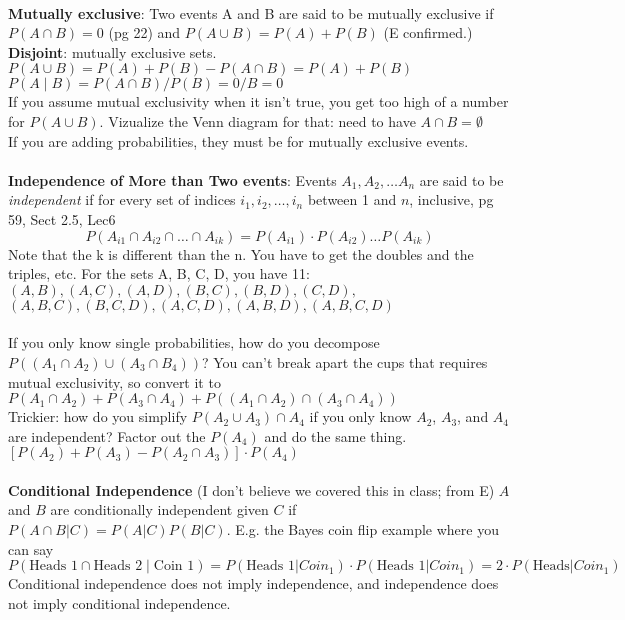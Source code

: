 \hfill \\
\textbf{Mutually exclusive}: Two events A and B are said to be mutually exclusive if $P(A \cap B) = 0$ {\tiny (pg 22)} and $P(A \cup B) = P(A) + P(B)$  {\tiny (E confirmed.)}
\textbf{Disjoint}: mutually exclusive sets. \hfill \\
$P(A \cup B) = P(A) + P(B) - P(A \cap B) = P(A) + P(B) $ \hfill \\
$P(A \mid B) = P(A \cap B)/P(B) = 0/B = 0 $ \hfill \\
If you assume mutual exclusivity when it isn't true, you get too high of a number for $P(A \cup B)$.  Vizualize the Venn diagram for that: need to have $A \cap B = \emptyset$ \hfill \\
If you are adding probabilities, they must be for mutually exclusive events. \hfill \\

\hfill \\
\textbf{Independence of More than Two events}:
Events $A_1, A_2, \dots  A_n$ are said to be \textit{independent} if for every set of indices $i_1, i_2, \dots, i_n$ between 1 and $n$, inclusive,  {\tiny pg 59, Sect 2.5, Lec6}
	\[ P(A_{i1} \cap A_{i2} \cap \dots \cap A_{ik}) = P(A_{i1}) \cdot P(A_{i2}) \dots P(A_{ik}) \]
Note that the k is different than the n.  You have to get the doubles and the triples, etc. 
For the sets A, B, C, D, you have 11: $(A, B), (A, C), (A, D), (B, C), (B, D), (C, D),$ \\
$(A, B, C), (B, C, D), (A, C, D), (A, B, D), (A, B, C, D)$ \hfill \\

\hfill \\

If you only know single probabilities, how do you decompose $P((A_1 \cap A_2) \cup (A_3 \cap B_4))$?  You can't break apart the cups {\tiny that requires mutual exclusivity}, so convert it to $P(A_1 \cap A_2) + P(A_3 \cap A_4) + P((A_1 \cap A_2) \cap (A_3 \cap A_4))$ \hfill \\

Trickier: how do you simplify $P(A_2 \cup A_3) \cap A_4 $ if you only know $A_2$, $A_3$, and $A_4$ are independent?  Factor out the $P(A_4)$ and do the same thing. $[P(A_2) + P(A_3) - P(A_2 \cap A_3)]\cdot P(A_4)$\hfill \\
\hfill \\

\textbf{Conditional Independence} {\tiny (I don't believe we covered this in class; from E)} ${A}$ and ${B}$ are conditionally independent given ${C}$ if $P({A}\cap {B}|{C}) = P({A}|{C})P({B}|{C})$.  E.g. the Bayes coin flip example where you can say $P(\mbox{Heads 1} \cap \mbox{Heads 2} \mid \mbox{Coin 1}) = P(\mbox{Heads 1}|Coin_1) \cdot P(\mbox{Heads 1}|Coin_1) = 2 \cdot P(\mbox{Heads}|Coin_1)$ Conditional independence does not imply independence, and independence does not imply conditional independence.


